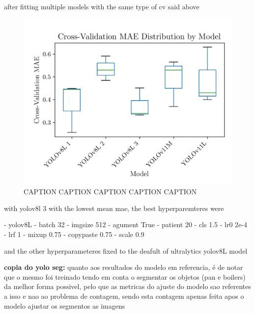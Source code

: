 \documentclass[conference]{IEEEtran}
\begin{document}
after fitting multiple models with the same type of cv said above

\begin{figure}[H]
    \centering
    \includegraphics[width=1\linewidth]{assets/model03_mae_boxplot.png}
    \caption{CAPTION CAPTION CAPTION CAPTION CAPTION}
    \label{fig:model03_mae_boxplot}
\end{figure}


with yolov8l 3 with the lowest mean mae, the best hyperparemteres were

- yolov8L
- batch 32
- imgsize 512
- agument True
- patient 20
- cls 1.5
- lr0 2e-4
- lrf 1
- mixup 0.75
- copypaste 0.75
- scale 0.9

and the other hyperparameteres fixed to the deafult of ultralytics yolov8L model


\textbf{copia do yolo seg:}
quanto aos resultados do modelo em referencia, é de notar que o mesmo foi treinado tendo em conta o segmentar os objetos (pan e boilers) da melhor forma possivel, pelo que as metricas do ajuste do modelo sao referentes a isso e nao ao problema de contagem, sendo esta contagem apenas feita apos o modelo ajustar os segmentos as imagens
\end{document}
